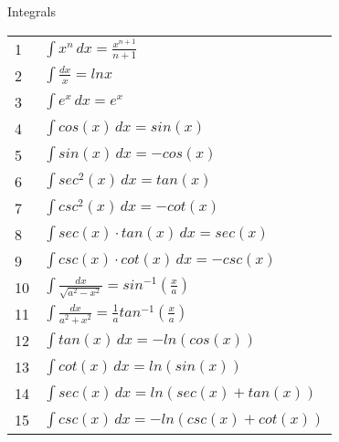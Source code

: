 %
%
%
\begin{section}{Integrals}
\begin{tabular}{ll}
  1&$\int{x^n} \,dx = \frac{x^{n+1}}{n+1}$\\
  2&$\int{\frac{dx}{x}} = ln{x}$\\
  3&$\int{e^x} \,dx = e^x$\\
  4&$\int{cos(x)} \,dx = sin(x)$\\
  5&$\int{sin(x)} \,dx = -cos(x)$\\
  6&$\int{sec^{2}(x)} \,dx = tan(x)$\\
  7&$\int{csc^{2}(x)} \,dx = -cot(x)$\\
  8&$\int{sec(x) \cdot tan(x)} \,dx = sec(x)$\\
  9&$\int{csc(x) \cdot cot(x)} \,dx = -csc(x)$\\
  10&$\int{\frac{dx}{\sqrt{a^2 - x^2}}} = sin^{-1}(\frac{x}{a})$\\
  11&$\int{\frac{dx}{a^2 + x^2}} = \frac{1}{a} tan^{-1}(\frac{x}{a})$\\
  12&$\int{tan(x)} \,dx = -ln(cos(x))$\\
  13&$\int{cot(x)} \,dx = ln(sin(x))$\\
  14&$\int{sec(x)} \,dx = ln(sec(x)+tan(x))$\\
  15&$\int{csc(x)} \,dx = -ln(csc(x)+cot(x))$\\
\end{tabular}
\end{section}
